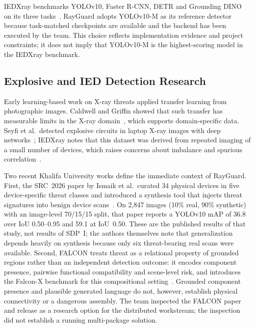 IEDXray benchmarks YOLOv10, Faster R-CNN, DETR and Grounding DINO on its three
tasks~\citep{takele2026iedxray}. RayGuard adopts YOLOv10-M as its reference
detector because task-matched checkpoints are available and the backend has been
executed by the team. This choice reflects implementation evidence and project
constraints; it does not imply that YOLOv10-M is the highest-scoring model in the
IEDXray benchmark.

\subsection{Explosive and IED Detection Research}
Early learning-based work on X-ray threats applied transfer learning from
photographic images. Caldwell and Griffin showed that such transfer has measurable
limits in the X-ray domain~\citep{caldwell2019transfer}, which supports
domain-specific data. Seyfi et al.\ detected explosive circuits in laptop X-ray
images with deep networks~\citep{seyfi2024circuit}; IEDXray notes that this
dataset was derived from repeated imaging of a small number of devices, which
raises concerns about imbalance and spurious correlation~\citep{takele2026iedxray}.

Two recent Khalifa University works define the immediate context of RayGuard.
First, the SRC~2026 paper by Ismaik et al.\ curated 34 physical devices in five
device-specific threat classes and introduced a synthesis tool that injects threat
signatures into benign device scans~\citep{ismaik2026src}. On 2,847 images
(10\% real, 90\% synthetic) with an image-level 70/15/15 split, that paper reports
a YOLOv10 mAP of 36.8 over IoU 0.50--0.95 and 59.1 at IoU~0.50. These are the
published results of that study, not results of SDP~I; the authors themselves note
that generalization depends heavily on synthesis because only six threat-bearing
real scans were available. Second, FALCON treats threat as a relational property
of grounded regions rather than an independent detection outcome: it encodes
component presence, pairwise functional compatibility and scene-level risk, and
introduces the Falcon-X benchmark for this compositional
setting~\citep{michael2026falcon}. Grounded component presence and plausible
generated language do not, however, establish physical connectivity or a
dangerous assembly. The team inspected the FALCON paper and release as a research
option for the distributed workstream; the inspection did not establish a running
multi-package solution.

